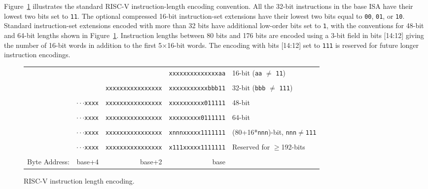 Figure~\ref{instlengthcode} illustrates the standard RISC-V
instruction-length encoding convention.  All the 32-bit instructions
in the base ISA have their lowest two bits set to {\tt 11}.  The
optional compressed 16-bit instruction-set extensions have their
lowest two bits equal to {\tt 00}, {\tt 01}, or {\tt 10}.  Standard
instruction-set extensions encoded with more than 32 bits have
additional low-order bits set to {\tt 1}, with the conventions for
48-bit and 64-bit lengths shown in Figure~\ref{instlengthcode}.
Instruction lengths between 80 bits and 176 bits are encoded using a
3-bit field in bits [14:12] giving the number of 16-bit words in
addition to the first 5$\times$16-bit words.  The encoding with bits
[14:12] set to {\tt 111} is reserved for future longer instruction
encodings.

\begin{figure}[hbt]
{
\begin{center}
\begin{tabular}{ccccl}
\cline{4-4}
& & & \multicolumn{1}{|c|}{\tt xxxxxxxxxxxxxxaa} & 16-bit ({\tt aa}
$\neq$ {\tt 11})\\
\cline{4-4}
\\
\cline{3-4}
& & \multicolumn{1}{|c|}{\tt xxxxxxxxxxxxxxxx}
& \multicolumn{1}{c|}{\tt xxxxxxxxxxxbbb11} & 32-bit ({\tt bbb}
$\neq$ {\tt 111}) \\
\cline{3-4}
\\
\cline{2-4}
\hspace{0.1in} 
& \multicolumn{1}{c|}{$\cdot\cdot\cdot${\tt xxxx} }
& \multicolumn{1}{c|}{\tt xxxxxxxxxxxxxxxx}
& \multicolumn{1}{c|}{\tt xxxxxxxxxx011111} & 48-bit \\
\cline{2-4}
\\
\cline{2-4}
\hspace{0.1in} 
& \multicolumn{1}{c|}{$\cdot\cdot\cdot${\tt xxxx} }
& \multicolumn{1}{c|}{\tt xxxxxxxxxxxxxxxx}
& \multicolumn{1}{c|}{\tt xxxxxxxxx0111111} & 64-bit \\
\cline{2-4}
\\
\cline{2-4}
\hspace{0.1in} 
& \multicolumn{1}{c|}{$\cdot\cdot\cdot${\tt xxxx} }
& \multicolumn{1}{c|}{\tt xxxxxxxxxxxxxxxx}
& \multicolumn{1}{c|}{\tt xnnnxxxxx1111111} & (80+16*{\tt nnn})-bit,
       {\tt nnn}$\neq${\tt 111} \\
\cline{2-4}
\\
\cline{2-4}
\hspace{0.1in} 
& \multicolumn{1}{c|}{$\cdot\cdot\cdot${\tt xxxx} }
& \multicolumn{1}{c|}{\tt xxxxxxxxxxxxxxxx}
& \multicolumn{1}{c|}{\tt x111xxxxx1111111} & Reserved for $\geq$192-bits \\
\cline{2-4}
\\
Byte Address: & \multicolumn{1}{r}{base+4} & \multicolumn{1}{r}{base+2} & \multicolumn{1}{r}{base} & \\
 \end{tabular}
\end{center}
}
\caption{RISC-V instruction length encoding.}
\label{instlengthcode}
\end{figure}

